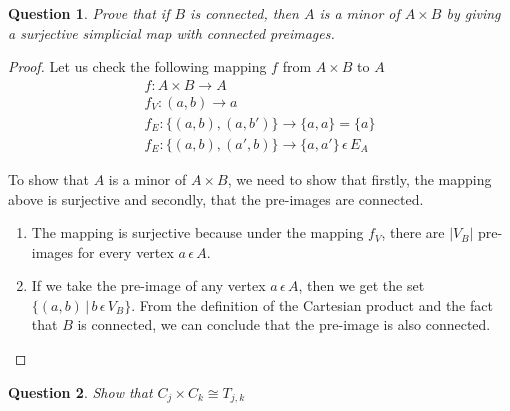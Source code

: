 \documentclass{article}
\newtheorem{question}{Question}
\begin{document}
\begin{question}
    Prove that if $B$ is connected, then $A$ is a minor of $A\times B$ by giving a surjective simplicial map with connected preimages. 
\end{question}

\begin{proof}
    Let us check the following mapping $f$ from $A \times B$ to $A$
  \begin{gather*}
      f: A \times B \rightarrow A \\
      f_V: (a, b) \rightarrow a \\
      f_E: \{ (a,b), (a,b') \} \rightarrow \{a, a\} = \{a\} \\
      f_E: \{ (a,b), (a',b) \} \rightarrow \{a, a'\} \hspace{2pt}  \epsilon \hspace{2pt} E_A
    \end{gather*}
    
    To show that $A$ is a minor of $A \times B$, we need to show that firstly, the mapping above is surjective and secondly, that the pre-images are connected.
    \begin{enumerate}
        \item The mapping is surjective because under the mapping $f_V$, there are $|V_B|$ pre-images for every vertex $a \hspace{2pt} \epsilon  \hspace{2pt}A$.
        \item If we take the pre-image of any vertex $a \hspace{2pt} \epsilon \hspace{2pt} A$, then we get the set
    $\{ (a,b) \hspace{2pt}|\hspace{2pt} b \hspace{2pt} \epsilon \hspace{2pt} V_B \}$. From the definition of the Cartesian product and the fact that $B$ is connected, we can conclude that the pre-image is also connected.
    \end{enumerate}
\end{proof}

\begin{question}
    Show that $C_j \times C_k \cong T_{j,k}$
\end{question}
\end{document}
